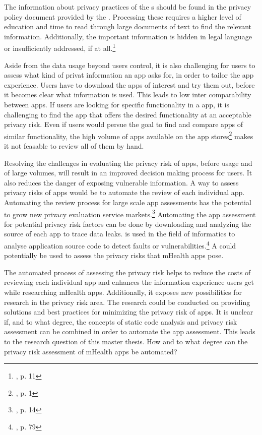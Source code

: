 \documentclass[
	a4paper,
	oneside,
	12pt,
	liststotocnumbered
]{article}
\let\cite\textcite
\begin{document}
The information about privacy practices of the \ap s should be found in the privacy policy document provided by the \ap.
Processing these \pps requires a higher level of education and time to read through large documents of text to find the relevant information. 
Additionally, the important information is hidden in legal language or insufficiently addressed, if at all.\footnote{\cite{Dehling2014}, p. 11}

Aside from the data usage beyond users control, it is also challenging for users to assess what kind of privat information an app asks for, in order to tailor the app experience. 
Users have to download the apps of interest and try them out, before it becomes clear what information is used. 
This leads to low inter comparability between apps. If users are looking for specific functionality in a \mH app, it is challenging to find the app that offers the desired functionality at an acceptable privacy risk. 
Even if users would persue the goal to find and compare \mH apps of similar functionality, the high volume of apps available on the app stores\footnote{\cite{Enck2011}, p. 1} makes it not feasable to review all of them by hand.

Resolving the challenges in evaluating the privacy risk of \mH apps, before usage and of large volumes, will result in an improved decision making process for users. 
It also reduces the danger of exposing vulnerable information. 
A way to assess privacy risks of \mH apps would be to automate the review of each individual app. 
Automating the review process for large scale app assessments has the potential to grow new privacy evaluation service markets.\footnote{\cite{Enck2011}, p. 14}
Automating the app assessment for potential privacy risk factors  can be done by downloading and analyzing the source of each app to trace data leaks. 
\Sca is used in the field of informatics to analyse application source code to detect faults or vulnerabilities.\footnote{\cite{Baca2008}, p. 79} 
A \sca could potentially be used to assess the privacy risks that mHealth apps pose.

The automated process of assessing the privacy risk helps to reduce the costs of reviewing each individual app and enhances the information experience users get while researching mHealth apps.
Additionally, it exposes new possibilities for research in the privacy risk area. The research could be conducted on providing solutions and best practices for minimizing the privacy risk of apps.
It is unclear if, and to what degree, the concepts of static code analysis and privacy risk assessment can be combined in order to automate the app assessment.
This leads to the research question of this master thesis. How and to what degree can the privacy risk assessment of mHealth apps be automated?
\end{document}
